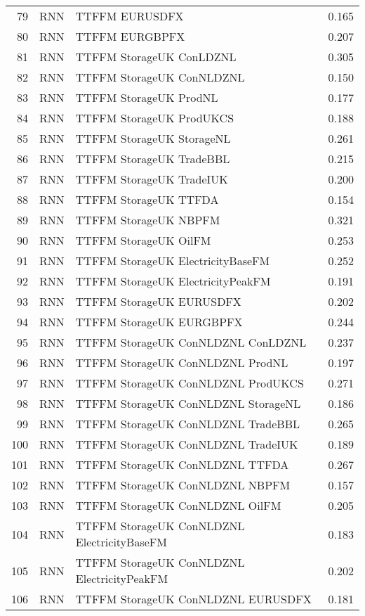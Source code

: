 \begin{table}[ht]
\begin{tabular}{rllr}
  79 & RNN & TTFFM EURUSDFX & 0.165 \\ 
  80 & RNN & TTFFM EURGBPFX & 0.207 \\ 
  81 & RNN & TTFFM StorageUK ConLDZNL & 0.305 \\ 
  82 & RNN & TTFFM StorageUK ConNLDZNL & 0.150 \\ 
  83 & RNN & TTFFM StorageUK ProdNL & 0.177 \\ 
  84 & RNN & TTFFM StorageUK ProdUKCS & 0.188 \\ 
  85 & RNN & TTFFM StorageUK StorageNL & 0.261 \\ 
  86 & RNN & TTFFM StorageUK TradeBBL & 0.215 \\ 
  87 & RNN & TTFFM StorageUK TradeIUK & 0.200 \\ 
  88 & RNN & TTFFM StorageUK TTFDA & 0.154 \\ 
  89 & RNN & TTFFM StorageUK NBPFM & 0.321 \\ 
  90 & RNN & TTFFM StorageUK OilFM & 0.253 \\ 
  91 & RNN & TTFFM StorageUK ElectricityBaseFM & 0.252 \\ 
  92 & RNN & TTFFM StorageUK ElectricityPeakFM & 0.191 \\ 
  93 & RNN & TTFFM StorageUK EURUSDFX & 0.202 \\ 
  94 & RNN & TTFFM StorageUK EURGBPFX & 0.244 \\ 
  95 & RNN & TTFFM StorageUK ConNLDZNL ConLDZNL & 0.237 \\ 
  96 & RNN & TTFFM StorageUK ConNLDZNL ProdNL & 0.197 \\ 
  97 & RNN & TTFFM StorageUK ConNLDZNL ProdUKCS & 0.271 \\ 
  98 & RNN & TTFFM StorageUK ConNLDZNL StorageNL & 0.186 \\ 
  99 & RNN & TTFFM StorageUK ConNLDZNL TradeBBL & 0.265 \\ 
  100 & RNN & TTFFM StorageUK ConNLDZNL TradeIUK & 0.189 \\ 
  101 & RNN & TTFFM StorageUK ConNLDZNL TTFDA & 0.267 \\ 
  102 & RNN & TTFFM StorageUK ConNLDZNL NBPFM & 0.157 \\ 
  103 & RNN & TTFFM StorageUK ConNLDZNL OilFM & 0.205 \\ 
  104 & RNN & TTFFM StorageUK ConNLDZNL ElectricityBaseFM & 0.183 \\ 
  105 & RNN & TTFFM StorageUK ConNLDZNL ElectricityPeakFM & 0.202 \\ 
  106 & RNN & TTFFM StorageUK ConNLDZNL EURUSDFX & 0.181 \\ 

\end{tabular}
\end{table}
